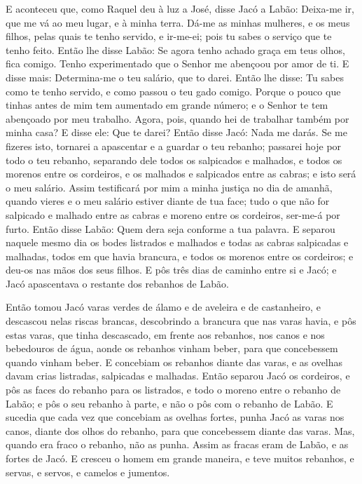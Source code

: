E aconteceu que, como Raquel deu à luz a José, disse Jacó a
Labão: Deixa-me ir, que me vá ao meu lugar, e à minha terra.
Dá-me as minhas mulheres, e os meus filhos, pelas quais te
tenho servido, e ir-me-ei; pois tu sabes o serviço que te tenho
feito. Então lhe disse Labão: Se agora tenho achado graça em
teus olhos, fica comigo. Tenho experimentado que o Senhor me
abençoou por amor de ti. E disse mais: Determina-me o teu
salário, que to darei. Então lhe disse: Tu sabes como te
tenho servido, e como passou o teu gado comigo. Porque o
pouco que tinhas antes de mim tem aumentado em grande número; e o
Senhor te tem abençoado por meu trabalho. Agora, pois, quando hei de
trabalhar também por minha casa? E disse ele: Que te darei?
Então disse Jacó: Nada me darás. Se me fizeres isto, tornarei a
apascentar e a guardar o teu rebanho; passarei hoje por todo
o teu rebanho, separando dele todos os salpicados e malhados, e
todos os morenos entre os cordeiros, e os malhados e salpicados
entre as cabras; e isto será o meu salário. Assim testificará
por mim a minha justiça no dia de amanhã, quando vieres e o meu
salário estiver diante de tua face; tudo o que não for salpicado e
malhado entre as cabras e moreno entre os cordeiros, ser-me-á por
furto. Então disse Labão: Quem dera seja conforme a tua
palavra. E separou naquele mesmo dia os bodes listrados e
malhados e todas as cabras salpicadas e malhadas, todos em que havia
brancura, e todos os morenos entre os cordeiros; e deu-os nas mãos
dos seus filhos. E pôs três dias de caminho entre si e Jacó;
e Jacó apascentava o restante dos rebanhos de Labão.

Então tomou Jacó varas verdes de álamo e de aveleira e de
castanheiro, e descascou nelas riscas brancas, descobrindo a
brancura que nas varas havia, e pôs estas varas, que tinha
descascado, em frente aos rebanhos, nos canos e nos bebedouros de
água, aonde os rebanhos vinham beber, para que concebessem quando
vinham beber. E concebiam os rebanhos diante das varas, e as
ovelhas davam crias listradas, salpicadas e malhadas. Então
separou Jacó os cordeiros, e pôs as faces do rebanho para os
listrados, e todo o moreno entre o rebanho de Labão; e pôs o seu
rebanho à parte, e não o pôs com o rebanho de Labão. E
sucedia que cada vez que concebiam as ovelhas fortes, punha Jacó as
varas nos canos, diante dos olhos do rebanho, para que concebessem
diante das varas. Mas, quando era fraco o rebanho, não as
punha. Assim as fracas eram de Labão, e as fortes de Jacó. E
cresceu o homem em grande maneira, e teve muitos rebanhos, e servas,
e servos, e camelos e jumentos.

